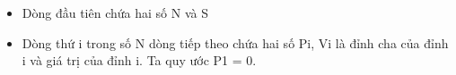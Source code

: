 \begin{itemize}
	\item     Dòng đầu tiên chứa hai số N và S   
	\item     Dòng thứ i trong số N dòng tiếp theo chứa hai số Pi, Vi là đỉnh cha của đỉnh i và giá trị của đỉnh i. Ta quy ước P1 = 0.   
\end{itemize}